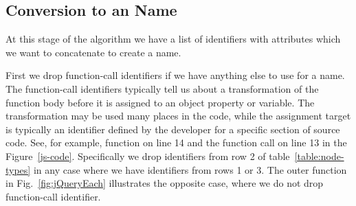 \documentclass[10pt, preprint]{sigplanconf}
\begin{document}
\begin{table}
\centering
{}
\caption{JavaScript Expression Reduction to a Name. Expressions which match an entry in the pattern column are converted as shown in the Name column. Here \texttt{e} indicates an expression, \texttt{id} indicates an identifier, \texttt{+} means string concatenation and \texttt{Name()} means we apply the pattern matching recursively.}
\label{expression-reduction} 
\end{table}    

\subsection{Conversion to an Name}
\label{sec:concatenation}
At this stage of the algorithm we have a list of identifiers with attributes which we want to concatenate to create a name. 

First we drop function-call identifiers if we have anything else to use for a name. The function-call identifiers typically tell us about a transformation of the function body before it is assigned to an object property or variable. The transformation may be used many places in the code, while the assignment target is typically an identifier defined by the developer for a specific section of source code.  See, for example, function on line 14 and the function call on line 13 in the Figure~\ref{js-code}. Specifically we drop identifiers from row 2 of table~\ref{table:node-types} in any case where we have identifiers from rows 1 or 3.  The outer function in Fig.~\ref{fig:jQueryEach} illustrates the opposite case, where we do not drop function-call identifier. 
 
\end{document}
